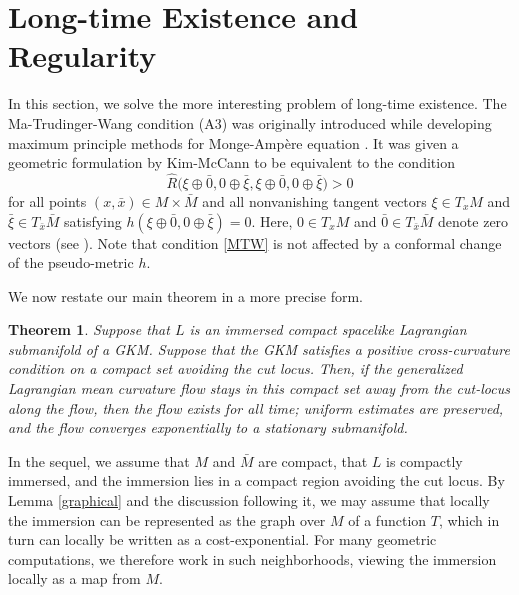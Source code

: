\documentclass[12pt,letterpaper]{amsart}%
\newcounter{mycounter}
\numberwithin{mycounter}{section}
\newtheorem{theorem}[mycounter]{Theorem}
\theoremstyle{plain}
\numberwithin{equation}{section}
\theoremstyle{definition}
\begin{document}
\fi

\section{Long-time Existence and Regularity}

In this section, we solve the more interesting problem of long-time existence. The
Ma-Trudinger-Wang condition (A3) was originally introduced while developing maximum principle methods for Monge-Amp\`ere equation \cite{MTW}.  It was given a geometric formulation by Kim-McCann \cite{KM} to be equivalent to the condition 
\begin{equation}
\label{MTW}\hat{R}\big(\xi\oplus\bar{0},0 \oplus\bar{\xi},\xi\oplus\bar{0},0
\oplus\bar{\xi}\big) > 0
\end{equation}
for all points $(x,\bar{x}) \in M\times\bar{M}$ and all nonvanishing tangent
vectors $\xi\in T_{x} M$ and $\bar{\xi} \in T_{\bar{x}} \bar{M}$ satisfying
$h(\xi\oplus\bar{0},0 \oplus\bar{\xi})=0$. Here, $0 \in T_{x} M$ and $\bar{0}
\in T_{\bar{x}} \bar{M}$ denote zero vectors (see \cite[Remark 4.2]{KMW}).
Note that condition \eqref{MTW} is not affected by a conformal change of
the pseudo-metric $h$.

\medskip
We now restate our main theorem in a more precise form.


\begin{theorem}
\label{thm:main_reg}Suppose that $L$ is an immersed compact spacelike Lagrangian
submanifold of a GKM. Suppose that the
GKM satisfies a positive cross-curvature condition on a compact set avoiding the cut locus. Then, if the generalized Lagrangian mean curvature flow stays in this compact set away from the cut-locus along
the flow, then the flow exists for all time; uniform estimates are preserved, and
the flow converges exponentially to a stationary submanifold.
\end{theorem}


In the sequel, we assume that $M$ and $\bar{M}$ are compact, that
$L$ is compactly immersed, and the immersion lies in a compact region avoiding the cut locus. By Lemma \ref{graphical} and the discussion following it, we may assume that locally the immersion can be represented as the graph over $M$ of a function $T$, which in turn can locally be written as a cost-exponential. For many geometric computations, we therefore work in such neighborhoods, viewing the immersion locally as a map from $M$.
\end{document}
